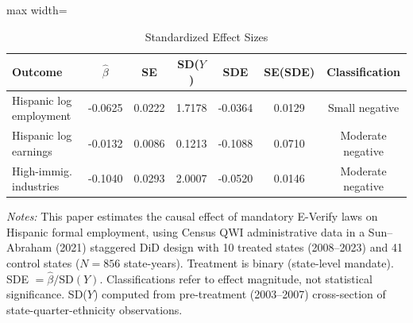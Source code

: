 \begin{table}[t]
\centering
\caption{Standardized Effect Sizes}
\label{tab:sde}
\begin{adjustbox}{max width=\textwidth}
\begin{tabular}{lcccccc}
\hline\hline
Outcome & $\hat{\beta}$ & SE & SD($Y$) & SDE & SE(SDE) & Classification \\
\hline
Hispanic log employment & -0.0625 & 0.0222 & 1.7178 & -0.0364 & 0.0129 & Small negative \\
Hispanic log earnings & -0.0132 & 0.0086 & 0.1213 & -0.1088 & 0.0710 & Moderate negative \\
High-immig. industries & -0.1040 & 0.0293 & 2.0007 & -0.0520 & 0.0146 & Moderate negative \\
\hline\hline
\end{tabular}
\end{adjustbox}
\begin{tablenotes}
\small
\item \textit{Notes:} This paper estimates the causal effect of mandatory E-Verify laws on Hispanic formal employment, using Census QWI administrative data in a Sun--Abraham (2021) staggered DiD design with 10 treated states (2008--2023) and 41 control states ($N = 856$ state-years). Treatment is binary (state-level mandate). SDE $= \hat{\beta} / \text{SD}(Y)$. Classifications refer to effect magnitude, not statistical significance. SD($Y$) computed from pre-treatment (2003--2007) cross-section of state-quarter-ethnicity observations.
\end{tablenotes}
\end{table}

